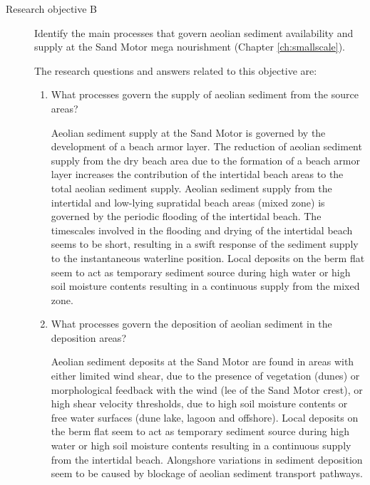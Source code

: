 \begin{description}
\begin{enumerate}[{A}1]
  \end{enumerate}

  \bigskip

\item[Research objective B] Identify the main processes that govern
  aeolian sediment availability and supply at the Sand Motor mega
  nourishment (Chapter \ref{ch:smallscale}).

  \medskip

  The research questions and answers related to this objective are:

  \begin{enumerate}[{B}1]
  \item What processes govern the supply of aeolian sediment from the
    source areas?

    Aeolian sediment supply at the Sand Motor is governed by the
    development of a beach armor layer. The reduction of aeolian
    sediment supply from the dry beach area due to the formation of a
    beach armor layer increases the contribution of the intertidal
    beach areas to the total aeolian sediment supply. Aeolian sediment
    supply from the intertidal and low-lying supratidal beach areas
    (mixed zone) is governed by the periodic flooding of the
    intertidal beach. The timescales involved in the flooding and
    drying of the intertidal beach seems to be short, resulting in a
    swift response of the sediment supply to the instantaneous
    waterline position. Local deposits on the berm flat seem to act as
    temporary sediment source during high water or high soil moisture
    contents resulting in a continuous supply from the mixed zone.

  \item What processes govern the deposition of aeolian sediment in
    the deposition areas?

    Aeolian sediment deposits at the Sand Motor are found in areas
    with either limited wind shear, due to the presence of vegetation
    (dunes) or morphological feedback with the wind (lee of the Sand
    Motor crest), or high shear velocity thresholds, due to high soil
    moisture contents or free water surfaces (dune lake, lagoon and
    offshore). Local deposits on the berm flat seem to act as
    temporary sediment source during high water or high soil moisture
    contents resulting in a continuous supply from the intertidal
    beach. Alongshore variations in sediment deposition seem to be
    caused by blockage of aeolian sediment transport pathways.


\end{enumerate}
\end{description}

